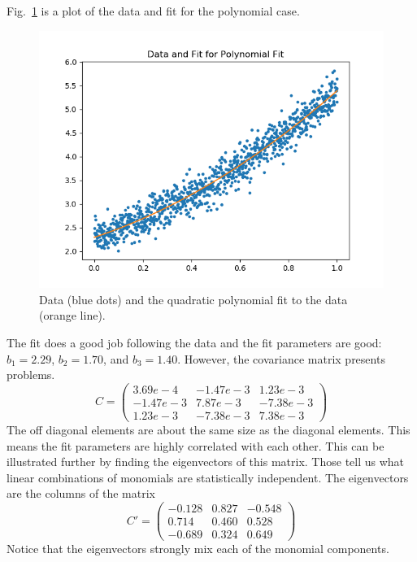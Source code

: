 \documentclass{scrartcl}
\begin{document}
Fig.~\ref{fig:polyfit} is a plot of the data and fit for the polynomial
case.
\begin{figure}
\begin{center}
\includegraphics[width=12cm]{polyfit}
\end{center}
\caption{\label{fig:polyfit}Data (blue dots) and the
quadratic polynomial fit to the data (orange line).}
\end{figure}
The fit does a good job following the data and the fit parameters
are good: $b_1=2.29$, $b_2=1.70$, and $b_3=1.40$. However, the
covariance matrix presents problems.
\begin{equation}
C=\left(\begin{array}{ccc}
3.69e-4 & -1.47e-3 & 1.23e-3\\
-1.47e-3 & 7.87 e-3 & -7.38e-3\\
1.23e-3 & -7.38e-3 & 7.38e-3\end{array}\right)
\end{equation}
The off diagonal elements are about the same size as the diagonal
elements. This means the fit parameters are highly correlated with
each other. This can be illustrated further by finding the eigenvectors
of this matrix. Those tell us what linear combinations of monomials
are statistically independent. The eigenvectors are the columns
of the matrix
\begin{equation}
C' = \left(\begin{array}{ccc}
-0.128 & 0.827 & -0.548 \\
0.714 & 0.460 & 0.528 \\
-0.689 & 0.324 & 0.649\end{array}\right)
\end{equation}
Notice that the eigenvectors strongly mix each of the monomial
components.
\end{document}
